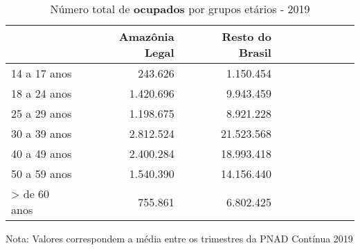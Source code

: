 \begin{table}[H]
\centering
\label{\_retrato\_emprego\_fotografia\_faixa\_etaria\_table\_ocupados}
\begin{threeparttable}
\caption{Número total de \textbf{ocupados} por grupos etários - 2019}
\begin{tabular}{l*{3}{rrr}}
\midrule \midrule
                    &Amazônia Legal&Resto do Brasil\\
\midrule
14 a 17 anos        &     243.626&   1.150.454\\
18 a 24 anos        &   1.420.696&   9.943.459\\
25 a 29 anos        &   1.198.675&   8.921.228\\
30 a 39 anos        &   2.812.524&  21.523.568\\
40 a 49 anos        &   2.400.284&  18.993.418\\
50 a 59 anos        &   1.540.390&  14.156.440\\
> de 60 anos        &     755.861&   6.802.425\\
\bottomrule
\end{tabular}
\begin{tablenotes}
\scriptsize{Nota: Valores correspondem a média entre os trimestres da PNAD Contínua 2019}
\end{tablenotes}
\end{threeparttable}
\end{table}
